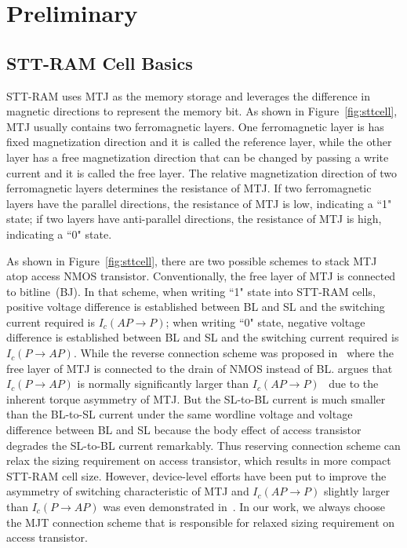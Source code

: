 \section{Preliminary} \label{sec:prelim}

\subsection{STT-RAM Cell Basics} \label{subsec:cell}
STT-RAM uses MTJ as the memory storage and leverages the difference in magnetic directions to represent the memory bit.  As shown in Figure~\ref{fig:sttcell}, MTJ usually contains two ferromagnetic layers.  One ferromagnetic layer is has fixed magnetization direction and it is called the reference layer, while the other layer has a free magnetization direction that can be changed by passing a write current and it is called the free layer. The relative magnetization direction of two ferromagnetic layers determines the resistance of MTJ.  If two ferromagnetic layers have the parallel directions, the resistance of MTJ is low, indicating a ``1" state; if two layers have anti-parallel directions, the resistance of MTJ is high, indicating a ``0" state.

As shown in Figure~\ref{fig:sttcell}, there are two possible schemes to stack MTJ atop access NMOS transistor. Conventionally, the free layer of MTJ is connected to bitline~(BJ). In that scheme, when writing ``1" state into STT-RAM cells, positive voltage difference is established between BL and SL and the switching current required is $I_{c}(AP\rightarrow P)$; when writing ``0" state, negative voltage difference is established between BL and SL and the switching current required is $I_{c}(P\rightarrow AP)$. While the reverse connection scheme was proposed in~\cite{STTRAM:Qualcomm09} where the free layer of MTJ is connected to the drain of NMOS instead of BL. \cite{STTRAM:Qualcomm09} argues that $I_{c}(P\rightarrow AP)$ is normally significantly larger than $I_{c}(AP\rightarrow P)$~\cite{STTRAM:APL05,STTRAM:PRB05} due to the inherent torque asymmetry of MTJ. But the SL-to-BL current is much smaller than the BL-to-SL current under the same wordline voltage and voltage difference between BL and SL because the body effect of access transistor degrades the SL-to-BL current remarkably. Thus reserving connection scheme can relax the sizing requirement on access transistor, which results in more compact STT-RAM cell size. However, device-level efforts have been put to improve the asymmetry of switching characteristic of MTJ and $I_{c}(AP\rightarrow P)$ slightly larger than $I_{c}(P\rightarrow AP)$ was even demonstrated in~\cite{STTRAM:Grandis07}. In our work, we always choose the MJT connection scheme that is responsible for relaxed sizing requirement on access transistor.


